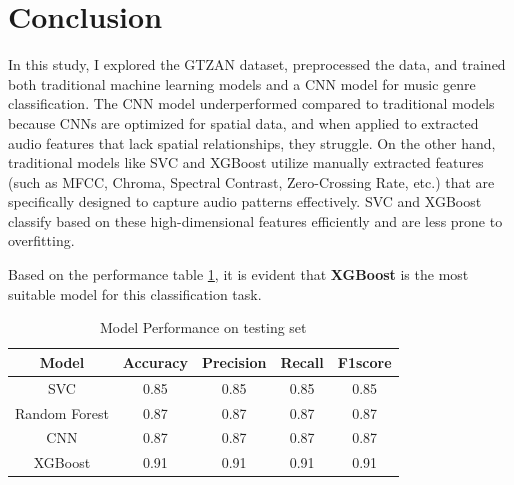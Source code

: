 \documentclass[11.5pt]{article}
\begin{document}
\section{Conclusion} \label{sec:conclusion}
In this study, I explored the GTZAN dataset, preprocessed the data, and trained both traditional machine learning models and a CNN model for music genre classification. The CNN model underperformed compared to traditional models because CNNs are optimized for spatial data, and when applied to extracted audio features that lack spatial relationships, they struggle. On the other hand, traditional models like SVC and XGBoost utilize manually extracted features (such as MFCC, Chroma, Spectral Contrast, Zero-Crossing Rate, etc.) that are specifically designed to capture audio patterns effectively. SVC and XGBoost classify based on these high-dimensional features efficiently and are less prone to overfitting.

Based on the performance table \ref{tab:performance}, it is evident that \textbf{XGBoost} is the most suitable model for this classification task.
\begin{table}[h]
    \centering
    \begin{tabular}{ccccc}
        \toprule
        \textbf{Model} & \textbf{Accuracy} & \textbf{Precision} & \textbf{Recall} & \textbf{F1\-score} \\
        \midrule
        SVC            & 0.85              & 0.85               & 0.85            & 0.85               \\
        Random Forest  & 0.87              & 0.87               & 0.87            & 0.87               \\
        CNN            & 0.87              & 0.87               & 0.87            & 0.87               \\
        XGBoost        & 0.91              & 0.91               & 0.91            & 0.91               \\
        \bottomrule
    \end{tabular}
    \caption{Model Performance on testing set}
    \label{tab:performance}
\end{table}

\clearpage
\printbibliography[heading=bibintoc, title = {References}]
\end{document}

